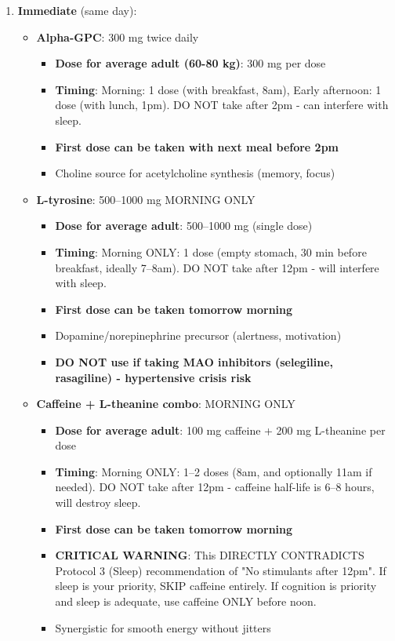\begin{enumerate}
    \item \textbf{Immediate} (same day):
    \begin{itemize}
        \item \textbf{Alpha-GPC}: 300 mg twice daily
        \begin{itemize}
            \item \textbf{Dose for average adult (60-80 kg)}: 300 mg per dose
            \item \textbf{Timing}: Morning: 1 dose (with breakfast, 8am), Early afternoon: 1 dose (with lunch, 1pm). DO NOT take after 2pm - can interfere with sleep.
            \item \textbf{First dose can be taken with next meal before 2pm}
            \item Choline source for acetylcholine synthesis (memory, focus)
        \end{itemize}

        \item \textbf{L-tyrosine}: 500--1000 mg MORNING ONLY
        \begin{itemize}
            \item \textbf{Dose for average adult}: 500--1000 mg (single dose)
            \item \textbf{Timing}: Morning ONLY: 1 dose (empty stomach, 30 min before breakfast, ideally 7--8am). DO NOT take after 12pm - will interfere with sleep.
            \item \textbf{First dose can be taken tomorrow morning}
            \item Dopamine/norepinephrine precursor (alertness, motivation)
            \item \textbf{DO NOT use if taking MAO inhibitors (selegiline, rasagiline) - hypertensive crisis risk}
        \end{itemize}

        \item \textbf{Caffeine + L-theanine combo}: MORNING ONLY
        \begin{itemize}
            \item \textbf{Dose for average adult}: 100 mg caffeine + 200 mg L-theanine per dose
            \item \textbf{Timing}: Morning ONLY: 1--2 doses (8am, and optionally 11am if needed). DO NOT take after 12pm - caffeine half-life is 6--8 hours, will destroy sleep.
            \item \textbf{First dose can be taken tomorrow morning}
            \item \textbf{CRITICAL WARNING}: This DIRECTLY CONTRADICTS Protocol 3 (Sleep) recommendation of "No stimulants after 12pm". If sleep is your priority, SKIP caffeine entirely. If cognition is priority and sleep is adequate, use caffeine ONLY before noon.
            \item Synergistic for smooth energy without jitters
        \end{itemize}


\end{itemize}
\end{enumerate}
